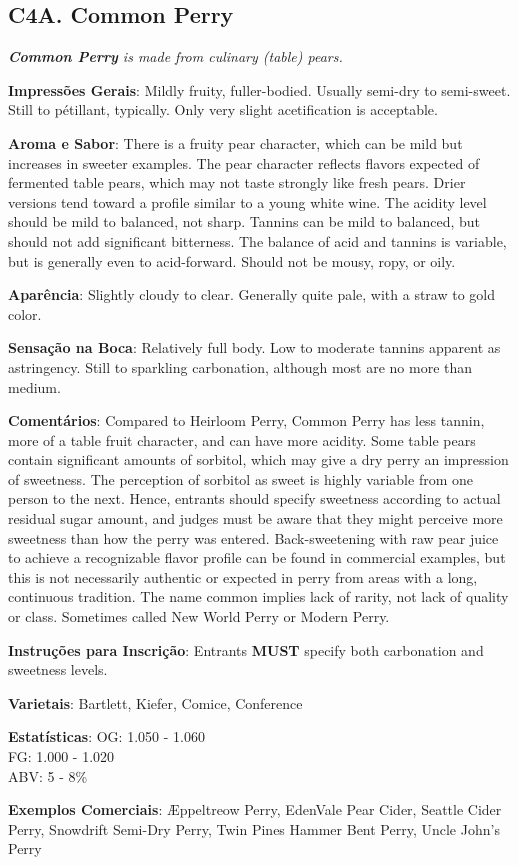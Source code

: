 \subsection*{C4A. Common Perry}

\textit{\textbf{Common Perry} is made from culinary (table) pears.}

\textbf{Impressões Gerais}: Mildly fruity, fuller-bodied. Usually semi-dry to semi-sweet. Still to pétillant, typically. Only very slight acetification is acceptable.

\textbf{Aroma e Sabor}: There is a fruity pear character, which can be mild but increases in sweeter examples. The pear character reflects flavors expected of fermented table pears, which may not taste strongly like fresh pears. Drier versions tend toward a profile similar to a young white wine. The acidity level should be mild to balanced, not sharp. Tannins can be mild to balanced, but should not add significant bitterness. The balance of acid and tannins is variable, but is generally even to acid-forward. Should not be mousy, ropy, or oily.

\textbf{Aparência}: Slightly cloudy to clear. Generally quite pale, with a straw to gold color.

\textbf{Sensação na Boca}: Relatively full body. Low to moderate tannins apparent as astringency. Still to sparkling carbonation, although most are no more than medium.

\textbf{Comentários}: Compared to Heirloom Perry, Common Perry has less tannin, more of a table fruit character, and can have more acidity. Some table pears contain significant amounts of sorbitol, which may give a dry perry an impression of sweetness. The perception of sorbitol as sweet is highly variable from one person to the next. Hence, entrants should specify sweetness according to actual residual sugar amount, and judges must be aware that they might perceive more sweetness than how the perry was entered. Back-sweetening with raw pear juice to achieve a recognizable flavor profile can be found in commercial examples, but this is not necessarily authentic or expected in perry from areas with a long, continuous tradition. The name common implies lack of rarity, not lack of quality or class. Sometimes called New World Perry or Modern Perry.

\textbf{Instruções para Inscrição}: Entrants \textbf{MUST} specify both carbonation and sweetness levels.

\textbf{Varietais}: Bartlett, Kiefer, Comice, Conference

\textbf{Estatísticas}: OG: 1.050 - 1.060 \\
\phantom{ } \hspace{16.5mm} FG: 1.000 - 1.020 \\
\phantom{ } \hspace{16.5mm} ABV: 5 - 8\%

\textbf{Exemplos Comerciais}: Æppeltreow Perry, EdenVale Pear Cider, Seattle Cider Perry, Snowdrift Semi-Dry Perry, Twin Pines Hammer Bent Perry, Uncle John's Perry